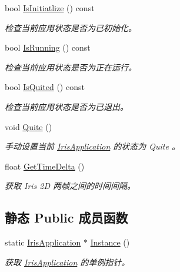 \begin{DoxyCompactItemize}
bool \hyperlink{class_iris2_d_1_1_iris_application_ab7a5b7f956f23d3fb3d2ee0de573cb53}{Is\+Initiatlize} () const
\begin{DoxyCompactList}\small\item\em 检查当前应用状态是否为已初始化。 \end{DoxyCompactList}\item 
bool \hyperlink{class_iris2_d_1_1_iris_application_a795cea1f5d8112a7db7d6429f306a5ff}{Is\+Running} () const
\begin{DoxyCompactList}\small\item\em 检查当前应用状态是否为正在运行。 \end{DoxyCompactList}\item 
bool \hyperlink{class_iris2_d_1_1_iris_application_ae9760ff496a4c80f96ad49331407c2e4}{Is\+Quited} () const
\begin{DoxyCompactList}\small\item\em 检查当前应用状态是否为已退出。 \end{DoxyCompactList}\item 
void \hyperlink{class_iris2_d_1_1_iris_application_adca8cada1a8841c3f409e856f6878331}{Quite} ()
\begin{DoxyCompactList}\small\item\em 手动设置当前 \hyperlink{class_iris2_d_1_1_iris_application}{Iris\+Application} 的状态为 Quite 。 \end{DoxyCompactList}\item 
float \hyperlink{class_iris2_d_1_1_iris_application_a3b8f4de1902aeda08acbe243aad34f15}{Get\+Time\+Delta} ()
\begin{DoxyCompactList}\small\item\em 获取 Iris 2D 两帧之间的时间间隔。 \end{DoxyCompactList}\end{DoxyCompactItemize}
\subsection*{静态 Public 成员函数}
\begin{DoxyCompactItemize}
\item 
static \hyperlink{class_iris2_d_1_1_iris_application}{Iris\+Application} $\ast$ \hyperlink{class_iris2_d_1_1_iris_application_ab2a9826c10d90732f398859782817f8e}{Instance} ()
\begin{DoxyCompactList}\small\item\em 获取 \hyperlink{class_iris2_d_1_1_iris_application}{Iris\+Application} 的单例指针。 \end{DoxyCompactList}\end{DoxyCompactItemize}


